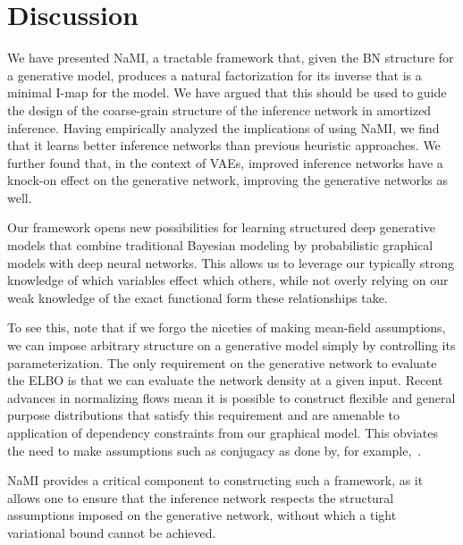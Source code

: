 \section{Discussion}
We have presented NaMI, a tractable framework that, given the BN structure for a generative model, produces a natural factorization for its inverse that is a minimal I-map for the model.  We have argued that this should be used to guide the design of the coarse-grain structure of the inference network in amortized inference. Having empirically analyzed the implications of using NaMI, we find that it learns better inference networks than previous heuristic approaches.
We further found that, in the context of VAEs, improved inference networks have a knock-on effect on the generative network, improving the generative networks as well.

Our framework opens new possibilities for learning structured deep generative models that combine traditional Bayesian modeling by probabilistic graphical models with deep neural networks. This allows us to leverage our typically strong knowledge of which variables effect which others, while not overly relying on our weak knowledge of the exact functional form these relationships take.

To see this, note that if we forgo the niceties of making mean-field assumptions,
we can impose arbitrary structure on a generative model simply by
controlling its parameterization.  The only requirement on the generative network
to evaluate the ELBO is that
we can evaluate the network density at a given input.  Recent
advances in normalizing flows \citep{HuangEtAl2018, ChenEtAl2018} mean it is possible
to construct flexible and general purpose distributions that satisfy this requirement
and are amenable to application of dependency constraints from our
graphical model.  This obviates the need to make assumptions such
as conjugacy as done by, for example,~\citet{JohnsonEtAl2016}.

NaMI provides a critical component to constructing such a framework, as it allows one to ensure that the inference
network respects the structural assumptions imposed on the generative network,
without which a tight variational bound cannot be achieved.

